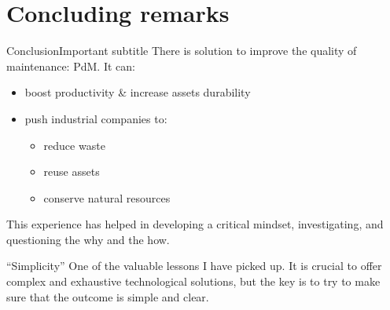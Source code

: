 \section{Concluding remarks}
\SectionPage

\begin{frame}{Conclusion}{Important subtitle}
    There is solution to improve the quality of maintenance: \acl{PdM}.
    It can:
    \begin{itemize}
        \item boost productivity \& increase assets durability 
        \item push industrial companies to:
        \begin{itemize}
            \item reduce waste
            \item reuse assets
            \item conserve natural resources
        \end{itemize}
    \end{itemize}

    This experience has helped in developing a critical mindset, investigating, and questioning the why and the how. 
    \begin{alertblock}{``Simplicity''} %
        One of the valuable lessons I have picked up.
        It is crucial to offer complex and exhaustive technological solutions, but the key is to try to make sure that the outcome is simple and clear. %
    \end{alertblock}
\end{frame}